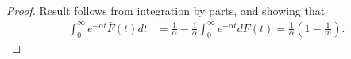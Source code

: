 \documentclass[a4paper,10pt,english]{article}
\begin{document}
\begin{proof}
%
Result follows from integration by parts, and showing that
\begin{align*}
\int_{0}^{\infty}e^{-\alpha t}\bar{F}(t) dt &= \frac{1}{\alpha} -\frac{1}{\alpha} \int_{0}^{\infty}e^{-\alpha t}dF(t) = \frac{1}{\alpha}\left(1- \frac{1}{m}\right).
\end{align*}
\end{proof} 
\end{document}
